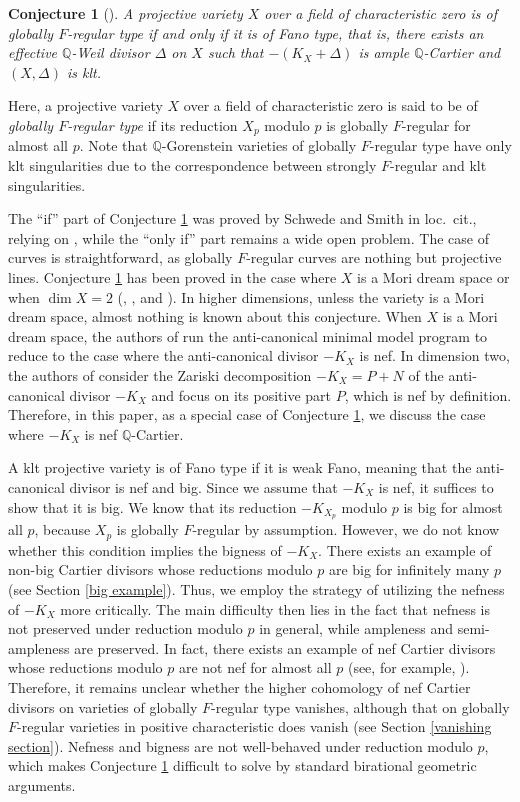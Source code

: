 \documentclass[12pt]{amsart}
\newcommand{\Q}{\mathbb{Q}}
\theoremstyle{plain}
\newtheorem{conj}[thm]{Conjecture}
\theoremstyle{definition}
\theoremstyle{remark}
\newtheorem{defn and notation}[thm]{Definition and Notation}
\theoremstyle{plain}
\begin{document}
\begin{conj}[\textup{\cite[Question 7.1]{SS10}}]\label{Introconj}
A projective variety $X$ over a field of characteristic zero is of globally $F$-regular type if and only if it is of Fano type, that is, there exists an effective $\Q$-Weil divisor $\Delta$ on $X$ such that $-(K_X+\Delta)$ is ample $\Q$-Cartier and $(X,\Delta)$ is klt. 
\end{conj}

Here, a projective variety $X$ over a field of characteristic zero is said to be of \textit{globally $F$-regular type} if its reduction $X_p$ modulo $p$ is globally $F$-regular for almost all $p$.
Note that $\Q$-Gorenstein varieties of globally $F$-regular type have only klt singularities due to the correspondence between strongly $F$-regular and klt singularities. 

The ``if'' part of Conjecture \ref{Introconj} was proved by Schwede and Smith in loc.~cit., relying on \cite{Takagi}, while the “only if” part remains a wide open problem. 
The case of curves is straightforward, as globally $F$-regular curves are nothing but projective lines. 
Conjecture \ref{Introconj} has been proved in the case where $X$ is a Mori dream space \cite{GOST} or when $\dim X=2$ (\cite{GT}, \cite{HP15}, and \cite{Okawa17}).
In higher dimensions, unless the variety is a Mori dream space, almost nothing is known about this conjecture.  
When $X$ is a Mori dream space, the authors of \cite{GOST} run the anti-canonical minimal model program to reduce to the case where the anti-canonical divisor $-K_X$ is nef. 
In dimension two, the authors of \cite{GT} consider the Zariski decomposition $-K_X=P+N$ of the anti-canonical divisor $-K_X$ and focus on its positive part $P$, which is nef by definition. 
Therefore, in this paper, as a special case of Conjecture \ref{Introconj}, we discuss the case where $-K_X$ is nef $\Q$-Cartier. 

A klt projective variety is of Fano type if it is weak Fano, meaning that the anti-canonical divisor is nef and big. 
Since we assume that $-K_X$ is nef, it suffices to show that it is big. 
We know that its reduction $-K_{X_p}$ modulo $p$ is big for almost all $p$, because $X_p$ is globally $F$-regular by assumption. 
However, we do not know whether this condition implies the bigness of $-K_X$. 
There exists an example of non-big Cartier divisors whose reductions modulo $p$ are big for infinitely many $p$ (see Section \ref{big example}). 
Thus, we employ the strategy of utilizing the nefness of $-K_X$ more critically. 
The main difficulty then lies in the fact that nefness is not preserved under reduction modulo $p$ in general, while ampleness and semi-ampleness are preserved. 
In fact, there exists an example of nef Cartier divisors whose reductions modulo $p$ are not nef for almost all $p$ (see, for example, \cite{Langer15}).
Therefore, it remains unclear whether the higher cohomology of nef Cartier divisors on varieties of globally $F$-regular type vanishes, although that on globally $F$-regular varieties in positive characteristic does vanish (see Section \ref{vanishing section}).
Nefness and bigness are not well-behaved under reduction modulo $p$, which makes Conjecture \ref{Introconj} difficult to solve by standard birational geometric arguments. 
\end{document}
